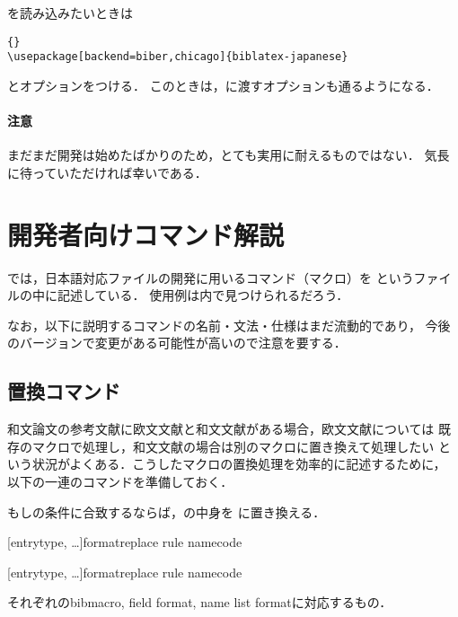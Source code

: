\documentclass[lualatex,ja=standard,magstyle=real]{bxjsarticle}
\begin{document}
を読み込みたいときは
\begin{lstlisting}[style=latex]{}
\usepackage[backend=biber,chicago]{biblatex-japanese}
\end{lstlisting}
とオプションをつける．
このときは，に渡すオプションも通るようになる．

\paragraph{注意}
まだまだ開発は始めたばかりのため，とても実用に耐えるものではない．
気長に待っていただければ幸いである．

\section{開発者向けコマンド解説}
では，日本語対応ファイルの開発に用いるコマンド（マクロ）を
というファイルの中に記述している．
使用例は内で見つけられるだろう．

なお，以下に説明するコマンドの名前・文法・仕様はまだ流動的であり，
今後のバージョンで変更がある可能性が高いので注意を要する．

\subsection{置換コマンド}

和文論文の参考文献に欧文文献と和文文献がある場合，欧文文献については
既存のマクロで処理し，和文文献の場合は別のマクロに置き換えて処理したい
という状況がよくある．こうしたマクロの置換処理を効率的に記述するために，
以下の一連のコマンドを準備しておく．

\begin{ltxsyntax}

  もしの条件に合致するならば，の中身を
  に置き換える．


  [entrytype, \dots]{format}{replace rule name}{code}

  [entrytype, \dots]{format}{replace rule name}{code}

  それぞれのbibmacro, field format, name list formatに対応するもの．
\end{ltxsyntax}
\end{document}
